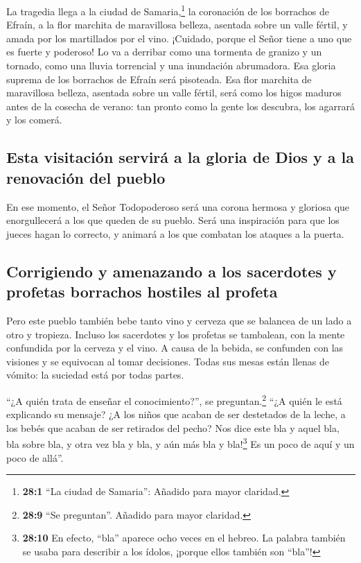  La tragedia llega a la ciudad de Samaria,\footnote{\textbf{28:1}
  ``La ciudad de Samaria'': Añadido para mayor claridad.} la coronación
de los borrachos de Efraín, a la flor marchita de maravillosa belleza,
asentada sobre un valle fértil, y amada por los martillados por el vino.
 ¡Cuidado, porque el Señor tiene a uno que es fuerte y
poderoso! Lo va a derribar como una tormenta de granizo y un tornado,
como una lluvia torrencial y una inundación abrumadora. 
Esa gloria suprema de los borrachos de Efraín será pisoteada.
 Esa flor marchita de maravillosa belleza, asentada sobre
un valle fértil, será como los higos maduros antes de la cosecha de
verano: tan pronto como la gente los descubra, los agarrará y los
comerá.

\hypertarget{esta-visitaciuxf3n-serviruxe1-a-la-gloria-de-dios-y-a-la-renovaciuxf3n-del-pueblo}{%
\subsection{Esta visitación servirá a la gloria de Dios y a la
renovación del
pueblo}\label{esta-visitaciuxf3n-serviruxe1-a-la-gloria-de-dios-y-a-la-renovaciuxf3n-del-pueblo}}

 En ese momento, el Señor Todopoderoso será una corona
hermosa y gloriosa que enorgullecerá a los que queden de su pueblo.
 Será una inspiración para que los jueces hagan lo
correcto, y animará a los que combatan los ataques a la puerta.

\hypertarget{corrigiendo-y-amenazando-a-los-sacerdotes-y-profetas-borrachos-hostiles-al-profeta}{%
\subsection{Corrigiendo y amenazando a los sacerdotes y profetas
borrachos hostiles al
profeta}\label{corrigiendo-y-amenazando-a-los-sacerdotes-y-profetas-borrachos-hostiles-al-profeta}}

 Pero este pueblo también bebe tanto vino y cerveza que se
balancea de un lado a otro y tropieza. Incluso los sacerdotes y los
profetas se tambalean, con la mente confundida por la cerveza y el vino.
A causa de la bebida, se confunden con las visiones y se equivocan al
tomar decisiones.  Todas sus mesas están llenas de vómito:
la suciedad está por todas partes.

 ``¿A quién trata de enseñar el conocimiento?'', se
preguntan.\footnote{\textbf{28:9} ``Se preguntan''. Añadido para mayor
  claridad.} ``¿A quién le está explicando su mensaje? ¿A los niños que
acaban de ser destetados de la leche, a los bebés que acaban de ser
retirados del pecho?  Nos dice este bla y aquel bla, bla
sobre bla, y otra vez bla y bla, y aún más bla y bla!\footnote{\textbf{28:10}
  En efecto, ``bla'' aparece ocho veces en el hebreo. La palabra también
  se usaba para describir a los ídolos, ¡porque ellos también son
  ``bla''!} Es un poco de aquí y un poco de allá''.

